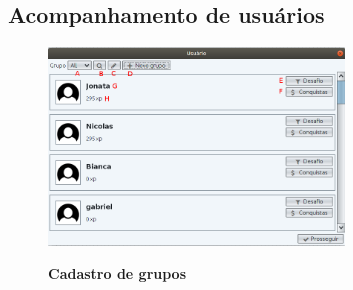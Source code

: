 \documentclass[
	12pt,				%
	oneside,			%
	a4paper,			%
	english,			%
	french,				%
	spanish,			%
	brazil,				%
	]{abntex2}
\begin{document}
\subsection{Acompanhamento de usuários}

\begin{figure}[H]
\centering
\caption{\textbf{Cadastro de grupos}}
\includegraphics[width=0.7\textwidth]{imagens/visnode_usuarios.png}
\sourceAuthor
\label{fig:visnodeNovoGrupo}
\end{figure}
\end{document}
